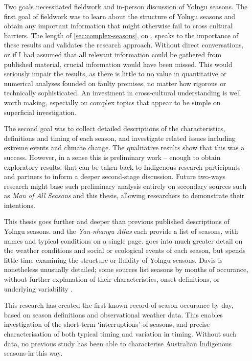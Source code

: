Two goals necessitated fieldwork and in-person discussion of Yolngu seasons.
The first goal of fieldwork  was to learn about the structure of Yolngu
seasons and obtain any important information that might otherwise
fail to cross cultural barriers.  The length of \cref{sec:complex-seasons},
on \textit{}, speaks to the importance of these
results and validates the research approach.
%
Without direct conversations, or if I had assumed that all relevant information
could be gathered from published material, crucial information would have been
missed.  This would seriously impair the results, as there is little to no value
in quantitative or numerical analyses
founded on faulty premises, no matter how rigorous or technically sophisticated.
An investment in cross-cultural understanding is well worth making, especially
on complex topics that appear to be simple on superficial investigation.

The second goal was to collect detailed descriptions of the characteristics,
definitions and timing of each season, and investigate related issues
including extreme events and climate change.  The qualitative results
show that this was a success.  However, in a sense this is preliminary work --
enough to obtain exploratory results, that can be taken back to Indigenous
research participants and partners to inform a deeper second-stage discussion.  Future
two-ways research might base such preliminary analysis entirely on secondary sources
such as \textit{Man of All Seasons} \citep{davis1989} and this thesis,
allowing researchers to demonstrate their intentions.


This thesis goes further and deeper than previous published descriptions of Yolngu seasons.
\citet{barber2005} and the \textit{Yan-nhangu Atlas} \citep{atlas2014} each
provide a list of seasons, with names and typical conditions on a single page.
\citet{davis1989} goes into much greater detail on the weather conditions and
social or ecological events of each season, but spends little time examining
the structure or fluidity of Yolngu seasons.  Davis is nonetheless unusually
detailed; some sources \citep[eg.][]{BOM-iwk} list seasons by months of
occurance, without further explanation of their characteristics,
onset definitions, or underlying variability .


This research has created the first known record of season occurance by day,
based on season definitions and observational weather data.  This enables
investigation of the short-term `interruptions' of seasons, and precise
characterisation of both typical timing and variation in timing.  Without
such data, no previous study \citep[eg.][]{davis1989,barber2005,CSIROcals,BOM-iwk}
has been able to characterise Australian Indigenous seasons in this way.



